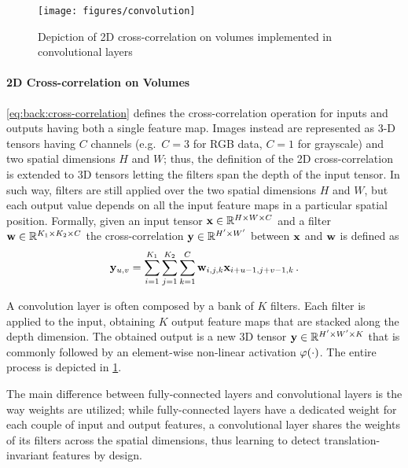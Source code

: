 \begin{figure}
    \centering
    \texttt{[image: figures/convolution]}
    \caption{Depiction of 2D cross-correlation on volumes implemented in convolutional layers}
    \label{fig:back:convolution}
\end{figure}

\paragraph{2D Cross-correlation on Volumes}
\ref{eq:back:cross-correlation} defines the cross-correlation operation for inputs and outputs having both a single feature map.
Images instead are represented as 3-D tensors having $C$ channels (e.g.\ $C=3$ for RGB data, $C=1$ for grayscale) and two spatial dimensions $H$ and $W$;
thus, the definition of the 2D cross-correlation is extended to 3D tensors letting the filters span the depth of the input tensor.
In such way, filters are still applied over the two spatial dimensions $H$ and $W$, but each output value depends on all the input feature maps in a particular spatial position.
Formally, given an input tensor $\mathbf{x} \in \mathbb{R}^{H \times W \times C}$ and a filter $\mathbf{w} \in \mathbb{R}^{K_1 \times K_2 \times C}$ the cross-correlation $\mathbf{y} \in \mathbb{R}^{H' \times W'}$ between $\mathbf{x}$ and $\mathbf{w}$ is defined as
%
\begin{equation}\label{eq:back:channel-cross-correlation}
    \mathbf{y}_{u,v} = \sum_{i=1}^{K_1} \sum_{j=1}^{K_2} \sum_{k=1}^C \mathbf{w}_{i,j,k} \mathbf{x}_{i+u-1,j+v-1,k} \,.
\end{equation}

A convolution layer is often composed by a bank of $K$ filters.
Each filter is applied to the input, obtaining $K$ output feature maps that are stacked along the depth dimension.
The obtained output is a new 3D tensor $\mathbf{y} \in \mathbb{R}^{H' \times W' \times K}$ that is commonly followed by an element-wise non-linear activation $\varphi(\cdot)$.
The entire process is depicted in \ref{fig:back:convolution}.

The main difference between fully-connected layers and convolutional layers is the way weights are utilized;
while fully-connected layers have a dedicated weight for each couple of input and output features, a convolutional layer shares the weights of its filters across the spatial dimensions, thus learning to detect translation-invariant features by design.

